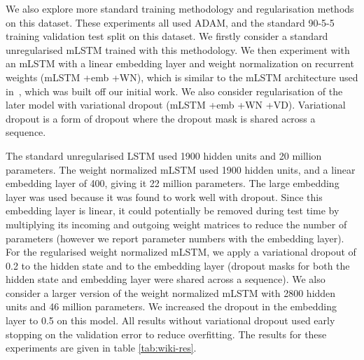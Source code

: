 \documentclass{article}
\begin{document}
We also explore more standard training methodology and regularisation methods on this dataset. These experiments all used ADAM, and the standard 90-5-5 training validation test split on this dataset. We firstly consider a standard unregularised mLSTM trained with this methodology. We then experiment with an mLSTM with a linear embedding layer and weight normalization \citep{salimans2016} on recurrent weights (mLSTM +emb +WN), which is similar to the mLSTM architecture used in~\citep{radford2017}, which was built off our initial work. We also consider regularisation of the later model with variational dropout \citep{gal2016} (mLSTM +emb +WN +VD). Variational dropout is a form of dropout \citep{srivastava2014} where the dropout mask is shared across a sequence.

The standard unregularised LSTM used 1900 hidden units and 20 million parameters. The weight normalized mLSTM used 1900 hidden units, and a linear embedding layer of 400, giving it 22 million parameters. The large embedding layer was used because it was found to work well with dropout. Since this embedding layer is linear, it could potentially be removed during test time by multiplying its incoming and outgoing weight matrices to reduce the number of parameters (however we report parameter numbers with the embedding layer). For the regularised weight normalized mLSTM, we apply a variational dropout of 0.2 to the hidden state and to the embedding layer (dropout masks for both the hidden state and embedding layer were shared across a sequence). We also consider a larger version of the weight normalized mLSTM with 2800 hidden units and 46 million parameters. We increased the dropout in the embedding layer to 0.5 on this model. All results without variational dropout used early stopping on the validation error to reduce overfitting. The results for these experiments are given in table \ref{tab:wiki-res}.
 
\end{document}
